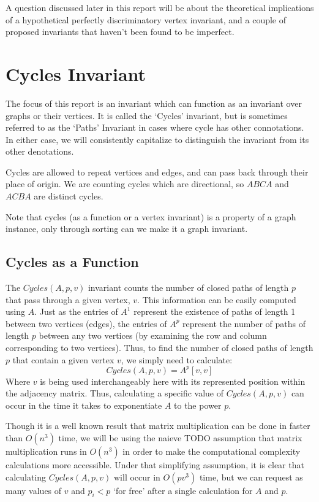 \documentclass[11pt,a4paper]{report}
\begin{document}
A question discussed later in this report will be about the theoretical implications of a hypothetical perfectly discriminatory vertex invariant, and a couple of proposed invariants that haven't been found to be imperfect.

\section{Cycles Invariant}
The focus of this report is an invariant which can function as an invariant over graphs or their vertices.
It is called the `Cycles' invariant, but is sometimes referred to as the `Paths' Invariant in cases where cycle has other connotations.
In either case, we will consistently capitalize to distinguish the invariant from its other denotations.

Cycles are allowed to repeat vertices and edges, and can pass back through their place of origin.
We are counting cycles which are directional, so $ABCA$ and $ACBA$ are distinct cycles.

Note that cycles (as a function or a vertex invariant) is a property of a graph instance, only through sorting can we make it a graph invariant.

\subsection{Cycles as a Function}

The $Cycles(A, p, v)$ invariant counts the number of closed paths of length $p$ that pass through a given vertex, $v$. 
This information can be easily computed using $A$. 
Just as the entries of $A^1$ represent the existence of paths of length 1 between two vertices (edges), the entries of $A^p$ represent the number of paths of length $p$ between any two vertices (by examining the row and column corresponding to two vertices).
Thus, to find the number of closed paths of length $p$ that contain a given vertex $v$, we simply need to calculate: 
$$Cycles(A, p, v) = A^p[v, v]$$
Where $v$ is being used interchangeably here with its represented position within the adjacency matrix. 
Thus, calculating a specific value of $Cycles(A, p, v)$ can occur in the time it takes to exponentiate $A$ to the power $p$.

Though it is a well known result that matrix multiplication can be done in faster than $O(n^3)$ time, we will be using the naieve TODO assumption that matrix multiplication runs in $O(n^3)$ in order to make the computational complexity calculations more accessible.  
Under that simplifying assumption, it is clear that calculating $Cycles(A, p, v)$ will occur in $O(pv^3)$ time, but we can request as many values of $v$ and $p_i < p$ `for free' after a single calculation for $A$ and $p$.
\end{document}
